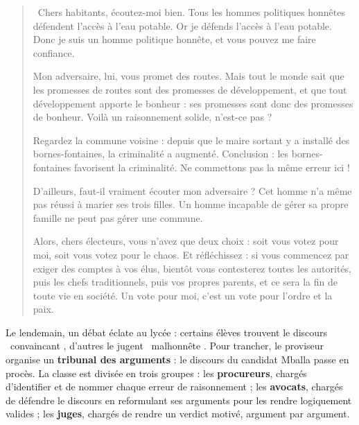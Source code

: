 \documentclass[11pt]{article}
\newcounter{popsec}
\newcounter{popsub}
\newcommand{\courssub}[1]{%
  \stepcounter{popsub}%
  \par\vspace{9pt}\noindent{\popxbold\fontsize{11.5}{13}\selectfont\color{popink}{\color{poporange}\thepopsec.\thepopsub}\hspace{6pt}#1}\par\nopagebreak\vspace{4pt}
}
\begin{document}
\begin{quote}
\guillemotleft\ Chers habitants, écoutez-moi bien. Tous les hommes politiques honnêtes défendent l'accès à l'eau potable. Or je défends l'accès à l'eau potable. Donc je suis un homme politique honnête, et vous pouvez me faire confiance.

Mon adversaire, lui, vous promet des routes. Mais tout le monde sait que les promesses de routes sont des promesses de développement, et que tout développement apporte le bonheur : ses promesses sont donc des promesses de bonheur. Voilà un raisonnement solide, n'est-ce pas ?

Regardez la commune voisine : depuis que le maire sortant y a installé des bornes-fontaines, la criminalité a augmenté. Conclusion : les bornes-fontaines favorisent la criminalité. Ne commettons pas la même erreur ici !

D'ailleurs, faut-il vraiment écouter mon adversaire ? Cet homme n'a même pas réussi à marier ses trois filles. Un homme incapable de gérer sa propre famille ne peut pas gérer une commune.

Alors, chers électeurs, vous n'avez que deux choix : soit vous votez pour moi, soit vous votez pour le chaos. Et réfléchissez : si vous commencez par exiger des comptes à vos élus, bientôt vous contesterez toutes les autorités, puis les chefs traditionnels, puis vos propres parents, et ce sera la fin de toute vie en société. Un vote pour moi, c'est un vote pour l'ordre et la paix. \guillemotright
\end{quote}

Le lendemain, un débat éclate au lycée : certains élèves trouvent le discours \guillemotleft\ convaincant \guillemotright, d'autres le jugent \guillemotleft\ malhonnête \guillemotright. Pour trancher, le proviseur organise un \textbf{tribunal des arguments} : le discours du candidat Mballa passe en procès. La classe est divisée en trois groupes : les \textbf{procureurs}, chargés d'identifier et de nommer chaque erreur de raisonnement ; les \textbf{avocats}, chargés de défendre le discours en reformulant ses arguments pour les rendre logiquement valides ; les \textbf{juges}, chargés de rendre un verdict motivé, argument par argument.

\courssub{Consignes}
\end{document}
